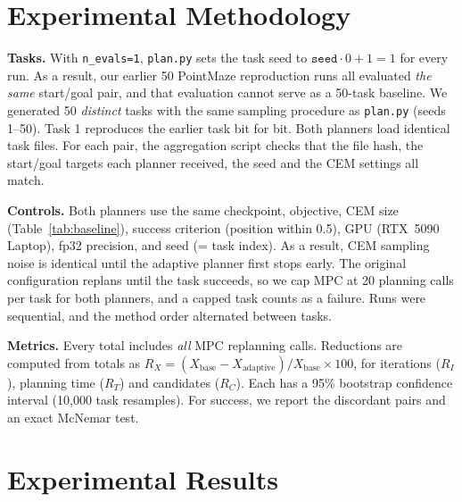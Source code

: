 \documentclass[10pt]{article}
\begin{document}
\section{Experimental Methodology}

\textbf{Tasks.} With \texttt{n\_evals=1}, \texttt{plan.py} sets the task seed to $\texttt{seed}\cdot 0+1=1$ for every
run. As a result, our earlier 50 PointMaze reproduction runs all evaluated \emph{the same} start/goal pair, and that
evaluation cannot serve as a 50-task baseline. We generated 50 \emph{distinct} tasks with the same sampling procedure
as \texttt{plan.py} (seeds 1--50). Task 1 reproduces the earlier task bit for bit. Both planners load identical task files.
For each pair, the aggregation script checks that the file hash, the start/goal targets each planner received, the seed and the CEM
settings all match.

\textbf{Controls.} Both planners use the same checkpoint, objective, CEM size (Table~\ref{tab:baseline}), success
criterion (position within 0.5), GPU (RTX~5090 Laptop), fp32 precision, and seed (= task index). As a result, CEM sampling
noise is identical until the adaptive planner first stops early. The original configuration replans until the task
succeeds, so we cap MPC at 20 planning calls per task for both planners, and a capped task counts as a failure. Runs were
sequential, and the method order alternated between tasks.

\textbf{Metrics.} Every total includes \emph{all} MPC replanning calls. Reductions are computed from totals as
$R_X=(X_{\text{base}}-X_{\text{adaptive}})/X_{\text{base}}\times 100$, for iterations ($R_I$), planning time ($R_T$) and
candidates ($R_C$). Each has a 95\% bootstrap confidence interval (10{,}000 task resamples). For success, we
report the discordant pairs and an exact McNemar test.

\section{Experimental Results}
\end{document}
